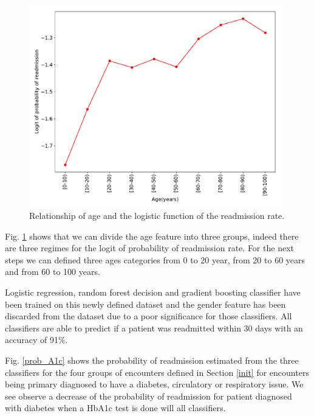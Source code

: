 \documentclass[12pt]{article}
\begin{document}
\begin{figure}[t!]
   \centering
    \includegraphics[width=11cm]{age_logit.pdf}
    \caption{\small Relationship of age and the logistic function of the readmission rate. }
    \label{logit_age}
\end{figure}

Fig. \ref{logit_age} shows that we can divide the age feature into three groups, indeed there are three regimes for the logit of probability of readmission rate. For the next steps we can defined three ages categories from 0 to 20 year, from 20 to 60 years and from 60 to 100 years. 

Logistic regression, random forest decision and gradient boosting classifier have been trained on this newly defined dataset and the gender feature has been discarded from the dataset due to a poor significance for those classifiers. All classifiers are able to predict if a patient was readmitted within 30 days with an accuracy of 91$\%$.


Fig. \ref{prob_A1c} shows the probability of readmission estimated from the three classifiers for the four groups of encounters
defined in Section \ref{init} for encounters being primary diagnosed to have a diabetes, circulatory or respiratory issue. We see observe a decrease of the probability of readmission for patient diagnosed with diabetes when a HbA1c test is done will all classifiers.
 
 
\end{document}
